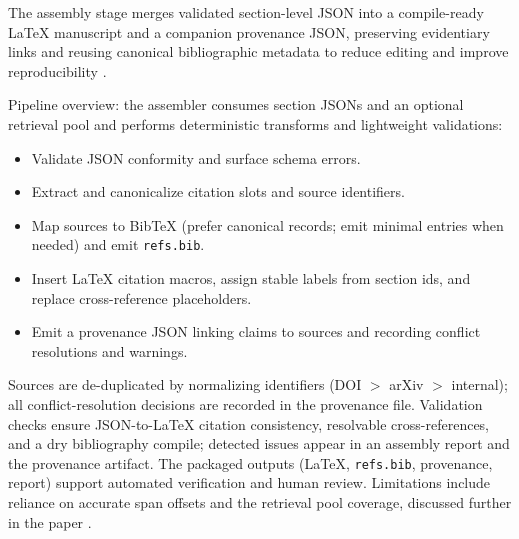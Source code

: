The assembly stage merges validated section-level JSON into a compile-ready LaTeX manuscript and a companion provenance JSON, preserving evidentiary links and reusing canonical bibliographic metadata to reduce editing and improve reproducibility \cite{web_bos_2023_latex_metadata_and_publishing_workflows}.

Pipeline overview: the assembler consumes section JSONs and an optional retrieval pool and performs deterministic transforms and lightweight validations:
\begin{itemize}
  \item Validate JSON conformity and surface schema errors.
  \item Extract and canonicalize citation slots and source identifiers.
  \item Map sources to BibTeX (prefer canonical records; emit minimal entries when needed) and emit \texttt{refs.bib}.
  \item Insert LaTeX citation macros, assign stable labels from section ids, and replace cross-reference placeholders.
  \item Emit a provenance JSON linking claims to sources and recording conflict resolutions and warnings.
\end{itemize}

Sources are de-duplicated by normalizing identifiers (DOI $>$ arXiv $>$ internal); all conflict-resolution decisions are recorded in the provenance file. Validation checks ensure JSON-to-LaTeX citation consistency, resolvable cross-references, and a dry bibliography compile; detected issues appear in an assembly report and the provenance artifact. The packaged outputs (LaTeX, \texttt{refs.bib}, provenance, report) support automated verification and human review. Limitations include reliance on accurate span offsets and the retrieval pool coverage, discussed further in the paper \cite{web_bos_2023_latex_metadata_and_publishing_workflows}.